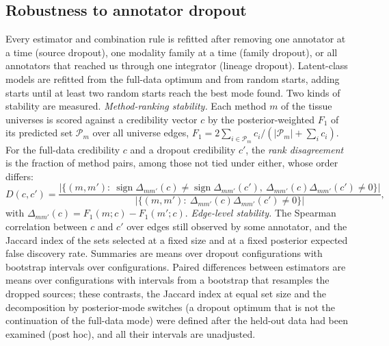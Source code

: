\subsection{Robustness to annotator dropout}\label{sec:robustness}
Every estimator and combination rule is refitted after removing one annotator at a time (source dropout), one modality family at a time (family dropout), or all annotators that reached us through one integrator (lineage dropout).
Latent-class models are refitted from the full-data optimum and from random starts, adding starts until at least two random starts reach the best mode found.
Two kinds of stability are measured.
\emph{Method-ranking stability.} Each method $m$ of the tissue universes is scored against a credibility vector $c$ by the posterior-weighted $F_1$ of its predicted set $\mathcal{P}_m$ over all universe edges, $F_1=2\sum_{i\in\mathcal{P}_m}c_i/(|\mathcal{P}_m|+\sum_i c_i)$. For the full-data credibility $c$ and a dropout credibility $c'$, the \emph{rank disagreement} is the fraction of method pairs, among those not tied under either, whose order differs:
\begin{equation}
  D(c,c')=\frac{\big|\{(m,m'):\ \operatorname{sign}\Delta_{mm'}(c)\neq\operatorname{sign}\Delta_{mm'}(c'),\ \Delta_{mm'}(c)\Delta_{mm'}(c')\neq 0\}\big|}{\big|\{(m,m'):\ \Delta_{mm'}(c)\Delta_{mm'}(c')\neq 0\}\big|},
  \label{eq:rankdisagreement}
\end{equation}
with $\Delta_{mm'}(c)=F_1(m;c)-F_1(m';c)$.
\emph{Edge-level stability.} The Spearman correlation between $c$ and $c'$ over edges still observed by some annotator, and the Jaccard index of the sets selected at a fixed size and at a fixed posterior expected false discovery rate.
Summaries are means over dropout configurations with bootstrap intervals over configurations. Paired differences between estimators are means over configurations with intervals from a bootstrap that resamples the dropped sources; these contrasts, the Jaccard index at equal set size and the decomposition by posterior-mode switches (a dropout optimum that is not the continuation of the full-data mode) were defined after the held-out data had been examined (post hoc), and all their intervals are unadjusted.

